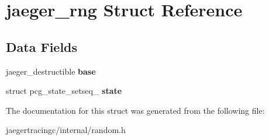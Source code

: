 \hypertarget{structjaeger__rng}{}\section{jaeger\+\_\+rng Struct Reference}
\label{structjaeger__rng}
\subsection*{Data Fields}
\begin{DoxyCompactItemize}
\item 
\mbox{\label{structjaeger__rng_a4108a00df97a5bb2e293a60d4ee1919c}} 
jaeger\+\_\+destructible {\bfseries base}
\item 
\mbox{\label{structjaeger__rng_a250694f288736339689044d47f3590b3}} 
struct pcg\+\_\+state\+\_\+setseq\+\_ {\bfseries state}
\end{DoxyCompactItemize}


The documentation for this struct was generated from the following file\+:\begin{DoxyCompactItemize}
\item 
jaegertracingc/internal/random.\+h\end{DoxyCompactItemize}
